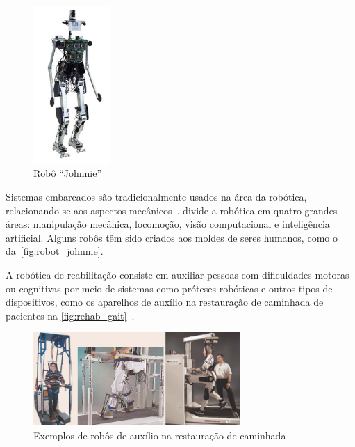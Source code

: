 \begin{figure}[!ht]
	\caption{\label{fig:robot_johnnie}Robô ``Johnnie''}
	\begin{center}
	    \includegraphics[height=6cm]{resources/robotics_robot_marwedel}
	\end{center}
\end{figure}

Sistemas embarcados são tradicionalmente usados na área da robótica, relacionando-se aos aspectos mecânicos~\cite{marwedel:2010}.  divide a robótica em quatro grandes áreas: manipulação mecânica, locomoção, visão computacional e inteligência artificial. Alguns robôs têm sido criados aos moldes de seres humanos, como o da~\autoref{fig:robot_johnnie}.

A robótica de reabilitação consiste em auxiliar pessoas com dificuldades motoras ou cognitivas por meio de sistemas como próteses robóticas e outros tipos de dispositivos, como os aparelhos de auxílio na restauração de caminhada de pacientes na \autoref{fig:rehab_gait}~\cite{siciliano:2008springer}. 

\begin{figure}[ht]
	\caption{\label{fig:rehab_gait}Exemplos de robôs de auxílio na restauração de caminhada}
	\begin{center}
	    \includegraphics[width=0.7\textwidth]{resources/robotics_rehab_1}
	\end{center}
\end{figure}

